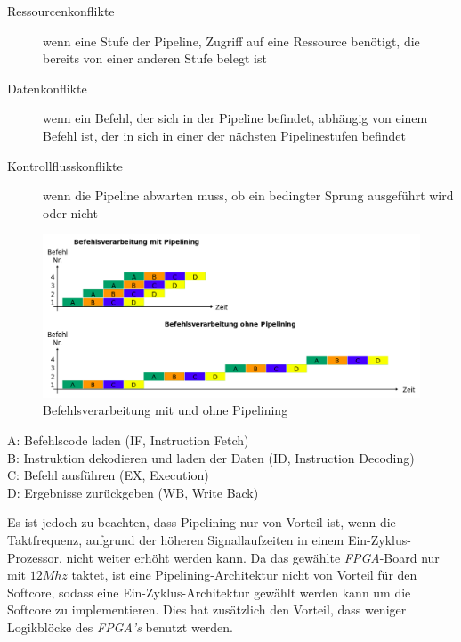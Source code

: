                 \begin{description}
                    \item[Ressourcenkonflikte] wenn eine Stufe der Pipeline, Zugriff auf eine Ressource benötigt, die bereits von einer anderen Stufe belegt ist 
                    \item[Datenkonflikte] wenn ein Befehl, der sich in der Pipeline befindet, abhängig von einem Befehl ist, der in sich in einer der nächsten Pipelinestufen befindet
                    \item[Kontrollflusskonflikte] wenn die Pipeline abwarten muss, ob ein bedingter Sprung ausgeführt wird oder nicht
                \end{description}
                \begin{figure}[H]
                    \centering
                    \includegraphics[scale=0.375]{img/pipelining.png}
                    \caption[Befehlsverarbeitung mit und ohne Pipelining]{Befehlsverarbeitung mit und ohne Pipelining \cite{pipelining} }
                    \label{fig:pipelining}
                \end{figure}
                \begin{description}
                    \item[A: Befehlscode laden (IF, Instruction Fetch)] 
                    \item[B: Instruktion dekodieren und laden der Daten (ID, Instruction Decoding)] 
                    \item[C: Befehl ausführen (EX, Execution)] 
                    \item[D: Ergebnisse zurückgeben (WB, Write Back)] 
                \end{description}
                Es ist jedoch zu beachten, dass Pipelining nur von Vorteil ist, wenn die Taktfrequenz, aufgrund der höheren Signallaufzeiten
                in einem Ein-Zyklus-Prozessor, nicht weiter erhöht werden kann.
                Da das gewählte \textit{FPGA}-Board nur mit $12 Mhz$ taktet, ist eine Pipelining-Architektur
                nicht von Vorteil für den Softcore, sodass eine Ein-Zyklus-Architektur gewählt werden kann um die Softcore zu implementieren.
                Dies hat zusätzlich den Vorteil, dass weniger Logikblöcke des \textit{FPGA's} benutzt werden.



